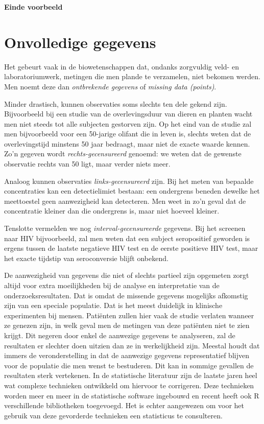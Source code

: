 \documentclass[
  dutch,
  letterpaper,
  12pt]{book}
\theoremstyle{definition}
\theoremstyle{definition}
\theoremstyle{definition}
\theoremstyle{remark}
\begin{document}
\textbf{Einde voorbeeld}

\section{Onvolledige gegevens}\label{sec-missing}

Het gebeurt vaak in de biowetenschappen dat, ondanks zorgvuldig veld- en
laboratoriumwerk, metingen die men plande te verzamelen, niet bekomen
werden. Men noemt deze dan \emph{ontbrekende gegevens} of \emph{missing
data (points)}.

Minder drastisch, kunnen observaties soms slechts ten dele gekend zijn.
Bijvoorbeeld bij een studie van de overlevingsduur van dieren en planten
wacht men niet steeds tot alle subjecten gestorven zijn. Op het eind van
de studie zal men bijvoorbeeld voor een 50-jarige olifant die in leven
is, slechts weten dat de overlevingstijd minstens 50 jaar bedraagt, maar
niet de exacte waarde kennen. Zo'n gegeven wordt
\emph{rechts-gecensureerd} genoemd: we weten dat de gewenste observatie
rechts van 50 ligt, maar verder niets meer.

Analoog kunnen observaties \emph{links-gecensureerd} zijn. Bij het meten
van bepaalde concentraties kan een detectielimiet bestaan: een
ondergrens beneden dewelke het meettoestel geen aanwezigheid kan
detecteren. Men weet in zo'n geval dat de concentratie kleiner dan die
ondergrens is, maar niet hoeveel kleiner.

Tenslotte vermelden we nog \emph{interval-gecensureerde} gegevens. Bij
het screenen naar HIV bijvoorbeeld, zal men weten dat een subject
seropositief geworden is ergens tussen de laatste negatieve HIV test en
de eerste positieve HIV test, maar het exacte tijdstip van seroconversie
blijft onbekend.

De aanwezigheid van gegevens die niet of slechts partieel zijn opgemeten
zorgt altijd voor extra moeilijkheden bij de analyse en interpretatie
van de onderzoeksresultaten. Dat is omdat de missende gegevens mogelijks
afkomstig zijn van een speciale populatie. Dat is het meest duidelijk in
klinische experimenten bij mensen. Patiënten zullen hier vaak de studie
verlaten wanneer ze genezen zijn, in welk geval men de metingen van deze
patiënten niet te zien krijgt. Dit negeren door enkel de aanwezige
gegevens te analyseren, zal de resultaten er slechter doen uitzien dan
ze in werkelijkheid zijn. Meestal houdt dat immers de veronderstelling
in dat de aanwezige gegevens representatief blijven voor de populatie
die men wenst te bestuderen. Dit kan in sommige gevallen de resultaten
sterk vertekenen. In de statistische literatuur zijn de laatste jaren
heel wat complexe technieken ontwikkeld om hiervoor te corrigeren. Deze
technieken worden meer en meer in de statistische software ingebouwd en
recent heeft ook R verschillende bibliotheken toegevoegd. Het is echter
aangewezen om voor het gebruik van deze gevorderde technieken een
statisticus te consulteren.
\end{document}
